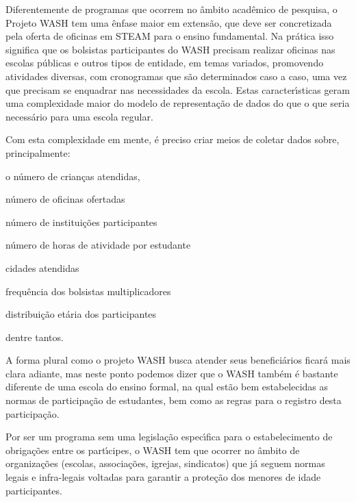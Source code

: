 \documentclass[
12pt,		%
openright,	%
twoside,  %
a4paper,			%
chapter=TITLE,		%
english,			%
french,				%
spanish,			%
brazil				%
]{USPSC-classe/USPSC_RedarTex}
\begin{document}
Diferentemente de programas que ocorrem no \^ambito acad\^emico de pesquisa, o Projeto WASH tem uma \^enfase maior em extens\~ao, que deve ser concretizada pela oferta de oficinas em STEAM para o ensino fundamental. Na pr\'atica isso significa que os bolsistas participantes do WASH precisam realizar oficinas nas escolas p\'ublicas e outros tipos de entidade, em temas variados, promovendo atividades diversas, com cronogramas que s\~ao determinados caso a caso, uma vez que precisam se enquadrar nas necessidades da escola. Estas caracter\'{\i}sticas geram uma complexidade maior do modelo de representa\c{c}\~ao de dados do que o que seria necess\'ario para uma escola regular.








Com esta complexidade em mente, \'e preciso criar meios de coletar dados sobre, principalmente:









\begin{alineas}
\item o n\'umero de crian\c{c}as atendidas,
\item n\'umero de oficinas ofertadas
\item n\'umero de institui\c{c}\~oes participantes
\item n\'umero de horas de atividade por estudante
\item cidades atendidas
\item frequ\^encia dos bolsistas multiplicadores
\item distribui\c{c}\~ao et\'aria dos participantes
\end{alineas}

dentre tantos.








A forma plural como o projeto WASH busca atender seus benefici\'arios ficar\'a mais clara adiante, mas neste ponto podemos dizer que o WASH tamb\'em \'e bastante diferente de uma escola do ensino formal, na qual est\~ao bem estabelecidas as normas de participa\c{c}\~ao de estudantes, bem como as regras para o registro desta participa\c{c}\~ao.








Por ser um programa sem uma legisla\c{c}\~ao espec\'{\i}fica para o estabelecimento de obriga\c{c}\~oes entre os part\'{\i}cipes, o WASH tem que ocorrer no \^ambito de organiza\c{c}\~oes (escolas, associa\c{c}\~oes, igrejas, sindicatos) que j\'a seguem normas legais e infra-legais voltadas para garantir a prote\c{c}\~ao dos menores de idade participantes.
\end{document}
